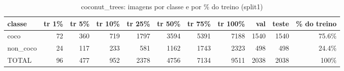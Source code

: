 \begin{table}[h]\centering\small
\caption{coconut_trees: imagens por classe e por \% do treino (split1)}
\begin{tabular}{lrrrrrrrrrr}\toprule
classe & tr 1\% & tr 5\% & tr 10\% & tr 25\% & tr 50\% & tr 75\% & tr 100\% & val & teste & \% do treino \\\midrule
coco & 72 & 360 & 719 & 1797 & 3594 & 5391 & 7188 & 1540 & 1540 & 75.6\% \\
non\_coco & 24 & 117 & 233 & 581 & 1162 & 1743 & 2323 & 498 & 498 & 24.4\% \\
\midrule TOTAL & 96 & 477 & 952 & 2378 & 4756 & 7134 & 9511 & 2038 & 2038 & 100\% \\\bottomrule
\end{tabular}\end{table}
